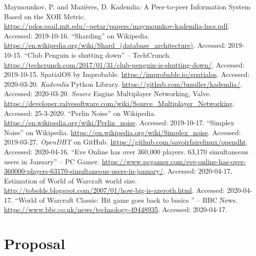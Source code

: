 \documentclass[12pt,notitlepage,a4paper]{report}
\begin{document}
	\begin{thebibliography}{9}
		 Maymounkov, P. and Mazières, D. Kademlia: A Peer-to-peer Information System Based on the XOR Metric. \url{https://pdos.csail.mit.edu/~petar/papers/maymounkov-kademlia-lncs.pdf}. Accessed: 2019-10-16.
		 ``Sharding'' on Wikipedia. \url{https://en.wikipedia.org/wiki/Shard_(database_architecture)}. Accessed: 2019-10-15.
		 ``Club Penguin is shutting down'' -- TechCrunch. \url{https://techcrunch.com/2017/01/31/club-penguin-is-shutting-down/}. Accessed: 2019-10-15.
		 SpatialOS by Improbable. \url{https://improbable.io/spatialos}. Accessed: 2020-03-20.
		 \emph{Kademlia} Python Library. \url{https://github.com/bmuller/kademlia/}. Accessed: 2020-03-20.
		 \emph{Source} Engine Multiplayer Networking, Valve. \url{https://developer.valvesoftware.com/wiki/Source_Multiplayer_Networking}. Accessed: 25-3-2020.
		 ``Perlin Noise'' on Wikipedia. \url{https://en.wikipedia.org/wiki/Perlin_noise}. Accessed: 2019-10-17.
		 ``Simplex Noise'' on Wikipedia.
		\url{https://en.wikipedia.org/wiki/Simplex_noise}. Accessed: 2019-03-27.
		 \emph{OpenDHT} on GitHub. \url{https://github.com/savoirfairelinux/opendht}. Accessed: 2020-04-16.
		 ``Eve Online has over 360,000 players. 63,170 simultaneous users in January'' -- PC Gamer. \url{https://www.pcgamer.com/eve-online-has-over-360000-players-63170-simultaneous-users-in-january/}. Accessed: 2020-04-17.
		 Estimation of World of Warcraft world size. \url{http://tobolds.blogspot.com/2007/01/how-big-is-azeroth.html}. Accessed: 2020-04-17.
		 ``World of Warcraft Classic: Hit game goes back to basics
		'' -- BBC News. \url{https://www.bbc.co.uk/news/technology-49448935}. Accessed: 2020-04-17.
	\end{thebibliography}
	\clearpage
	
	\appendix
	\chapter{Proposal}
	
\end{document}
